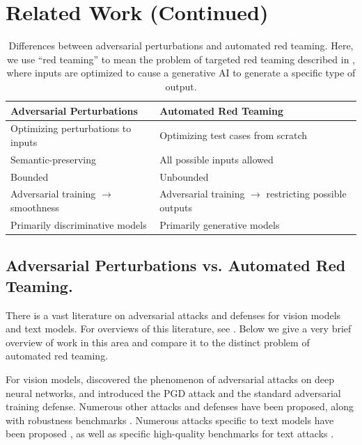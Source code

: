 \appendix

\section{Related Work (Continued)}\label{sec:related_work_continued}

\begin{table}[!htp]\centering
\caption{Differences between adversarial perturbations and automated red teaming. Here, we use ``red teaming'' to mean the problem of targeted red teaming described in , where inputs are optimized to cause a generative AI to generate a specific type of output.}\label{tab:adv_perturbations_red_teaming}
\begin{tabular}{ll}\toprule
Adversarial Perturbations &Automated Red Teaming \\\midrule
Optimizing perturbations to inputs &Optimizing test cases from scratch \\
Semantic-preserving &All possible inputs allowed \\
Bounded &Unbounded \\
Adversarial training $\to$ smoothness &Adversarial training $\to$ restricting possible outputs \\
Primarily discriminative models & Primarily generative models \\
\bottomrule
\end{tabular}
\end{table}

\subsection{Adversarial Perturbations vs. Automated Red Teaming.}\label{sec:adv_perturbations_red_teaming}
There is a vast literature on adversarial attacks and defenses for vision models and text models. For overviews of this literature, see \citep{chakraborty2021survey, xu2020adversarial, zhang2020adversarial, goyal2023survey}. Below we give a very brief overview of work in this area and compare it to the distinct problem of automated red teaming.

For vision models, \citet{szegedy2013intriguing} discovered the phenomenon of adversarial attacks on deep neural networks, and \citet{madry2017towards} introduced the PGD attack and the standard adversarial training defense. Numerous other attacks \citep{carlini2017towards, brown2017adversarial, athalye2018obfuscated, croce2020reliable} and defenses \citep{hendrycks2019using_pretraining, hendrycks2019using_selfsupervised, carmon2019unlabeled, cohen2019certified, carlini2022certified, wang2023better} have been proposed, along with robustness benchmarks \citep{kaufmann2019testing, croce2020robustbench}. Numerous attacks specific to text models have been proposed \citep{ebrahimi2017hotflip, iyyer2018adversarial, li2018textbugger, jin2020bert, li2020bert, guo-etal-2021-gradient}, as well as specific high-quality benchmarks for text attacks \citep{wang2021adversarial}.

